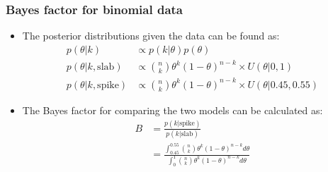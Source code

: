 \documentclass{beamer}
\begin{document}
\begin{frame}
\frametitle{Bayes factor for binomial data}

\begin{itemize}
\item The posterior distributions given the data can be found as:
\begin{align*}
p(\theta|k) &\propto p(k|\theta)p(\theta) \\
p(\theta|k, \text{slab}) &\propto \binom{n}{k} \theta^k (1 - \theta)^{n-k} \times U\left(\theta |0, 1\right) \\
p(\theta|k, \text{spike}) &\propto \binom{n}{k} \theta^k (1 - \theta)^{n-k} \times U\left(\theta |0.45, 0.55\right)
\end{align*}
\item The Bayes factor for comparing the two models can be calculated as:
\begin{align*}
B &= \frac{p(k|\text{spike})}{p(k|\text{slab})} \\
&= \frac{\int_{0.45}^{0.55} \binom{n}{k} \theta^k (1 - \theta)^{n-k} d\theta}{\int_{0}^{1} \binom{n}{k} \theta^k (1 - \theta)^{n-k} d\theta}
\end{align*}
\end{itemize}

\end{frame}
\end{document}
